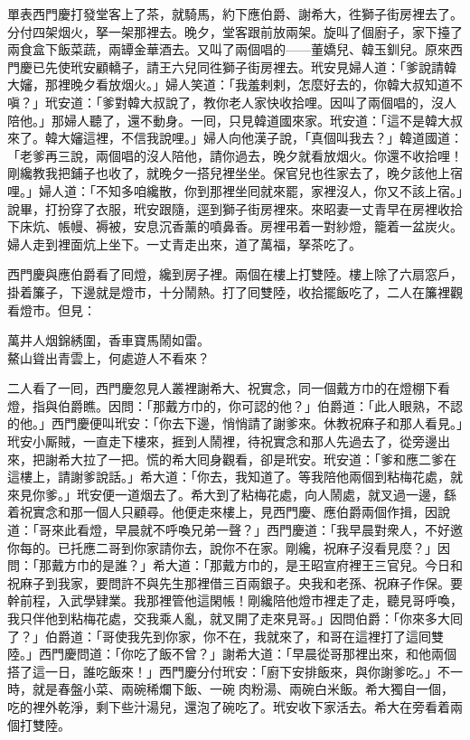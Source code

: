 單表西門慶打發堂客上了茶，就騎馬，約下應伯爵、謝希大，徃獅子街房裡去了。分付四架烟火，拏一架那裡去。晚夕，堂客跟前放兩架。旋叫了個廚子，家下擡了兩食盒下飯菜蔬，兩罈金華酒去。又叫了兩個唱的——董嬌兒、韓玉釧兒。原來西門慶已先使玳安顧轎子，請王六兒同徃獅子街房裡去。玳安見婦人道：「爹說請韓大嬸，那裡晚夕看放烟火。」婦人笑道：「我羞剌剌，怎麼好去的，你韓大叔知道不嗔？」玳安道：「爹對韓大叔說了，教你老人家快收拾哩。因叫了兩個唱的，沒人陪他。」那婦人聽了，還不動身。一囘，只見韓道國來家。玳安道：「這不是韓大叔來了。韓大嬸這裡，不信我說哩。」婦人向他漢子說，「真個叫我去？」韓道國道：「老爹再三說，兩個唱的沒人陪他，請你過去，晚夕就看放烟火。你還不收拾哩！剛纔教我把鋪子也收了，就晚夕一搭兒裡坐坐。保官兒也徃家去了，晚夕該他上宿哩。」婦人道：「不知多咱纔散，你到那裡坐囘就來罷，家裡沒人，你又不該上宿。」說畢，打扮穿了衣服，玳安跟隨，逕到獅子街房裡來。來昭妻一丈青早在房裡收拾下床炕、帳幔、褥被，安息沉香薰的噴鼻香。{}房裡弔着一對紗燈，籠着一盆炭火。婦人走到裡面炕上坐下。一丈青走出來，道了萬福，拏茶吃了。

西門慶與應伯爵看了囘燈，纔到房子裡。兩個在樓上打雙陸。樓上除了六扇窓戶，掛着簾子，下邊就是燈市，十分鬧熱。打了囘雙陸，收拾擺飯吃了，二人在簾裡觀看燈市。但見：

\begin{myquote}
萬井人烟錦綉圍，香車寶馬鬧如雷。\\鰲山聳出青雲上，何處遊人不看來？
\end{myquote}

二人看了一囘，西門慶忽見人叢裡謝希大、祝實念，同一個戴方巾的在燈棚下看燈，指與伯爵瞧。因問：「那戴方巾的，你可認的他？」伯爵道：「此人眼熟，不認的他。」西門慶便叫玳安：「你去下邊，悄悄請了謝爹來。休教祝麻子和那人看見。」玳安小厮賊，一直走下樓來，捱到人鬧裡，待祝實念和那人先過去了，從旁邊出來，把謝希大拉了一把。慌的希大囘身觀看，卻是玳安。玳安道：「爹和應二爹在這樓上，請謝爹說話。」希大道：「你去，我知道了。等我陪他兩個到粘梅花處，就來見你爹。」玳安便一道烟去了。希大到了粘梅花處，向人鬧處，就叉過一邊，繇着祝實念和那一個人只顧尋。他便走來樓上，{}見西門慶、應伯爵兩個作揖，因說道：「哥來此看燈，早晨就不呼喚兄弟一聲？」西門慶道：「我早晨對衆人，不好邀你每的。已托應二哥到你家請你去，說你不在家。剛纔，祝麻子沒看見麼？」因問：「那戴方巾的是誰？」希大道：「那戴方巾的，是王昭宣府裡王三官兒。今日和祝麻子到我家，要問許不與先生那裡借三百兩銀子。央我和老孫、祝麻子作保。要幹前程，入武學肄業。我那裡管他這閑帳！剛纔陪他燈市裡走了走，聽見哥呼喚，我只伴他到粘梅花處，交我乘人亂，就叉開了走來見哥。」因問伯爵：「你來多大囘了？」伯爵道：「哥使我先到你家，你不在，我就來了，和哥在這裡打了這囘雙陸。」西門慶問道：「你吃了飯不曾？」謝希大道：「早晨從哥那裡出來，和他兩個搭了這一日，誰吃飯來！」西門慶分付玳安：「廚下安排飯來，與你謝爹吃。」不一時，就是春盤小菜、兩碗稀爛下飯、一碗𤆑肉粉湯、兩碗白米飯。希大獨自一個，吃的裡外乾淨，剩下些汁湯兒，還泡了碗吃了。玳安收下家活去。希大在旁看着兩個打雙陸。

